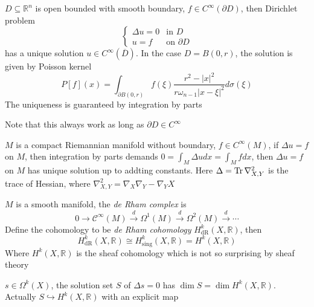 \documentclass[../main.tex]{subfiles}
\begin{document}
\begin{theorem}
$D\subseteq\mathbb R^n$ is open bounded with smooth boundary, $f\in C^\infty(\partial D)$, then Dirichlet problem
\[\begin{cases}
\Delta u=0&\text{in }D \\
u=f&\text{on }\partial D
\end{cases}\]
has a unique solution $u\in C^\infty(\overline D)$. In the case $D=B(0,r)$, the solution is given by Poisson kernel
\[P[f](x)=\int_{\partial B(0,r)}f(\xi)\dfrac{r^2-|x|^2}{r\omega_{n-1}|x-\xi|^2}d\sigma(\xi)\]
The uniqueness is guaranteed by integration by parts
\end{theorem}

\begin{remark}
Note that this always work as long as $\partial D\in C^\infty$
\end{remark}

\begin{theorem}
$M$ is a compact Riemannian manifold without boundary, $f\in C^\infty(M)$, if $\Delta u=f$ on $M$, then integration by parts demands $\displaystyle0=\int_M\Delta udx=\int_Mfdx$, then $\Delta u=f$ on $M$ has unique solution up to addting constants. Here $\Delta=\operatorname{Tr}\nabla^2_{X,Y}$ is the trace of Hessian, where $\nabla^2_{X,Y}=\nabla_X\nabla_Y-\nabla_YX$
\end{theorem}

\begin{theorem}
$M$ is a smooth manifold, the \textit{de Rham complex} is
\[0\to\mathcal C^\infty(M)\xrightarrow d\Omega^1(M)\xrightarrow d\Omega^2(M)\xrightarrow d\cdots\]
Define the cohomology to be \textit{de Rham cohomology} $H^k_{\mathrm{dR}}(X,\mathbb R)$, then
\[H^k_{\mathrm{dR}}(X,\mathbb R)\cong H^k_{\mathrm{sing}}(X,\mathbb R)=H^k(X,\mathbb R)\]
Where $H^k(X,\mathbb R)$ is the sheaf cohomology which is not so surprising by sheaf theory
\end{theorem}

\begin{theorem}
$s\in\Omega^k(X)$, the solution set $S$ of $\Delta s=0$ has $\dim S=\dim H^k(X,\mathbb R)$. Actually $S\hookrightarrow H^k(X,\mathbb R)$ with an explicit map
\end{theorem}
\end{document}
